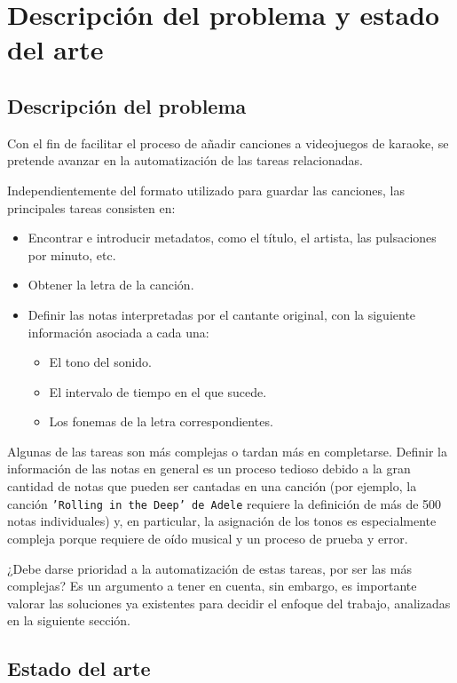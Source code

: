 \chapter{Descripción del problema y estado del arte}

\section{Descripción del problema}

Con el fin de facilitar el proceso de añadir canciones a videojuegos de karaoke, se pretende avanzar en la automatización de las tareas relacionadas.

Independientemente del formato utilizado para guardar las canciones, las principales tareas consisten en:

\begin{itemize}
	\item{Encontrar e introducir metadatos, como el título, el artista, las pulsaciones por minuto, etc.}
	\item{Obtener la letra de la canción.}
	\item{Definir las notas interpretadas por el cantante original, con la siguiente información asociada a cada una:}
	\begin{itemize}
		\item{El tono del sonido.}
		\item{El intervalo de tiempo en el que sucede.}
		\item{Los fonemas de la letra correspondientes.}
	\end{itemize}
\end{itemize}

Algunas de las tareas son más complejas o tardan más en completarse. Definir la información de las notas en general es un proceso tedioso debido a la gran cantidad de notas que pueden ser cantadas en una canción (por ejemplo, la canción \texttt{'Rolling in the Deep' de Adele} requiere la definición de más de 500 notas individuales) y, en particular, la asignación de los tonos es especialmente compleja porque requiere de oído musical y un proceso de prueba y error.

¿Debe darse prioridad a la automatización de estas tareas, por ser las más complejas? Es un argumento a tener en cuenta, sin embargo, es importante valorar las soluciones ya existentes para decidir el enfoque del trabajo, analizadas en la siguiente sección.

\section{Estado del arte}

